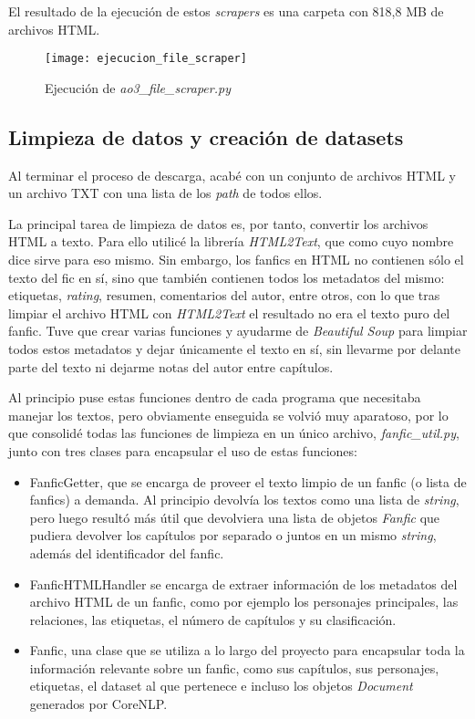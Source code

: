 \documentclass{pre-tfg}
\begin{document}
El resultado de la ejecución de estos \textit{scrapers} es una carpeta con 818,8 MB de archivos HTML.

\begin{figure}[h]
	\centering
	\texttt{[image: ejecucion\_file\_scraper]}
	\label{fig:file_scraper}
	\caption{Ejecución de \textit{ao3\_file\_scraper.py}}
\end{figure}


\subsection{Limpieza de datos y creación de datasets}
\label{sec:limpiezadatos}

Al terminar el proceso de descarga, acabé con un conjunto de archivos HTML y un archivo TXT con una lista de los \textit{path} de todos ellos.

La principal tarea de limpieza de datos es, por tanto, convertir los archivos HTML a texto. Para ello utilicé la librería \textit{HTML2Text}, que como cuyo nombre dice sirve para eso mismo. Sin embargo, los fanfics en HTML no contienen sólo el texto del fic en sí, sino que también contienen todos los metadatos del mismo: etiquetas, \textit{rating}, resumen, comentarios del autor, entre otros, con lo que tras limpiar el archivo HTML con \textit{HTML2Text} el resultado no era el texto puro del fanfic. Tuve que crear varias funciones y ayudarme de \textit{Beautiful Soup} para limpiar todos estos metadatos y dejar únicamente el texto en sí, sin llevarme por delante parte del texto ni dejarme notas del autor entre capítulos.

Al principio puse estas funciones dentro de cada programa que necesitaba manejar los textos, pero obviamente enseguida se volvió muy aparatoso, por lo que consolidé todas las funciones de limpieza en un único archivo, \textit{fanfic\_util.py}, junto con tres clases para encapsular el uso de estas funciones:

\begin{itemize}
	\item FanficGetter, que se encarga de proveer el texto limpio de un fanfic (o lista de fanfics) a demanda. Al principio devolvía los textos como una lista de \textit{string}, pero luego resultó más útil que devolviera una lista de objetos \textit{Fanfic} que pudiera devolver los capítulos por separado o juntos en un mismo \textit{string}, además del identificador del fanfic.
	\item FanficHTMLHandler se encarga de extraer información de los metadatos del archivo HTML de un fanfic, como por ejemplo los personajes principales, las relaciones, las etiquetas, el número de capítulos y su clasificación.
	\item Fanfic, una clase que se utiliza a lo largo del proyecto para encapsular toda la información relevante sobre un fanfic, como sus capítulos, sus personajes, etiquetas, el dataset al que pertenece e incluso los objetos \textit{Document} generados por CoreNLP.
\end{itemize}
\end{document}
